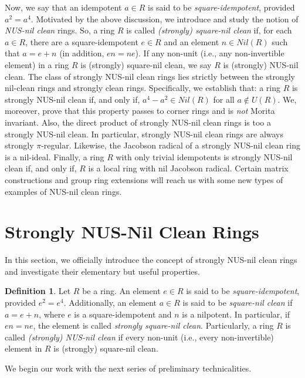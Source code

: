 \documentclass[12pt]{amsart}
\theoremstyle{definition}
\newtheorem{definition}[theorem]{Definition}
\begin{document}
Now, we say that an idempotent $a\in R$ is said to be {\it square-idempotent}, provided $a^2=a^4$. Motivated by the above discussion, we introduce and study the notion of {\it NUS-nil clean} rings. So, a ring $R$ is called {\it (strongly) square-nil clean} if, for each $a\in R$, there are a square-idempotent $e\in R$ and an element $n\in Nil(R)$ such that $a=e+n$ (in addition, $en=ne$). If any non-unit (i.e., any non-invertible element) in a ring $R$ is    (strongly) square-nil clean, we say $R$ is (strongly) NUS-nil clean. The class of strongly NUS-nil clean rings lies strictly between the strongly nil-clean rings and strongly clean rings. Specifically, we establish that: a ring $R$ is strongly NUS-nil clean if, and only if, $a^4-a^2\in Nil(R)$ for all $a\not\in U(R)$. We, moreover, prove that this property passes to corner rings and is {\it not} Morita invariant. Also, the direct product of strongly NUS-nil clean rings is too a strongly NUS-nil clean. In particular, strongly NUS-nil clean rings are always strongly $\pi$-regular. Likewise, the Jacobson radical of a strongly NUS-nil clean ring is a nil-ideal. Finally, a ring $R$ with only trivial idempotents is strongly NUS-nil clean if, and only if, $R$ is a local ring with nil Jacobson radical. Certain matrix constructions and group ring extensions will reach us with some new types of examples of NUS-nil clean rings.

\section{Strongly NUS-Nil Clean Rings}

In this section, we officially introduce the concept of strongly NUS-nil clean rings and investigate their elementary but useful properties.

\begin{definition}\label{2.1} Let $R$ be a ring. An element $e\in R$ is said to be {\it square-idempotent}, provided $e^2=e^4$. Additionally, an element $a\in R$ is said to be {\it square-nil clean} if $a=e+n$, where $e$ is a square-idempotent and $n$ is a nilpotent. In particular, if $en=ne$, the element is called {\it strongly square-nil clean}. Particularly, a ring $R$ is called {\it (strongly) NUS-nil clean} if every non-unit (i.e., every non-invertible) element in $R$ is (strongly) square-nil clean.
\end{definition}

We begin our work with the next series of preliminary technicalities.
\end{document}
